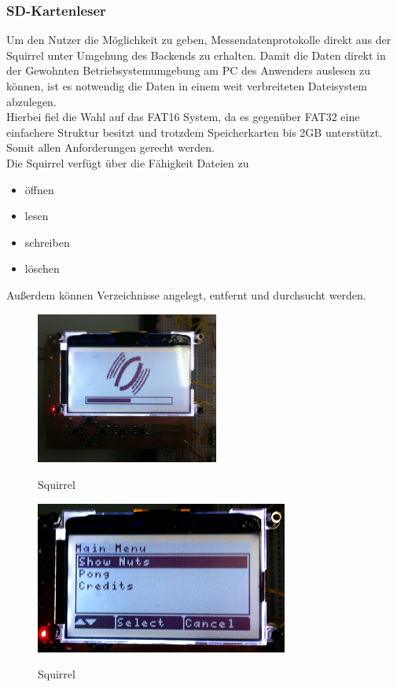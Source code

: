 \documentclass[12pt,a4paper]{article}
\begin{document}
\subsubsection{SD-Kartenleser}
Um den Nutzer die Möglichkeit zu geben, Messendatenprotokolle direkt aus der Squirrel unter Umgehung des Backends zu erhalten.
Damit die Daten direkt in der Gewohnten Betriebsystemumgebung am PC des Anwenders auslesen zu können, ist es notwendig die Daten in einem weit verbreiteten Dateisystem abzulegen.\\
Hierbei fiel die Wahl auf das FAT16 System, da es gegenüber FAT32 eine einfachere Struktur besitzt und trotzdem Speicherkarten bis 2GB unterstützt. Somit allen Anforderungen gerecht werden.\\
Die Squirrel verfügt über die Fähigkeit Dateien zu
\begin{itemize}
\item öffnen
\item lesen
\item schreiben
\item löschen
\end{itemize}
Außerdem können Verzeichnisse angelegt, entfernt und durchsucht werden.\\


\begin{figure}[h]
\includegraphics[height=5cm]{squirrel_shot1.png}
\label{fig:0}
\caption{Squirrel}
\end{figure}
\begin{figure}[h]
\includegraphics[height=5cm]{squirrel_shot2.png}
\label{fig:1}
\caption{Squirrel}
\end{figure}
\end{document}
